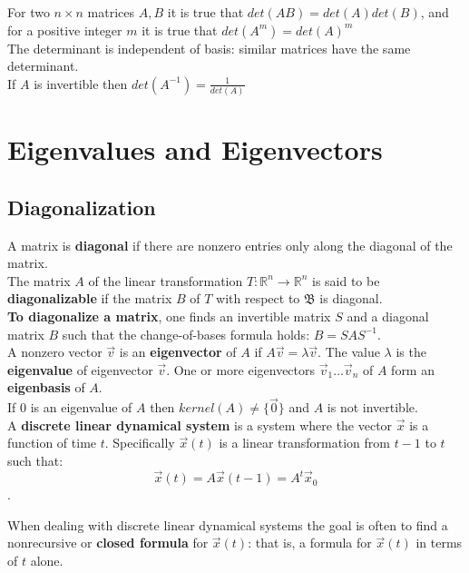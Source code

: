 \documentclass[]{scrartcl}
\begin{document}
	For two $n \times n$ matrices $A, B$ it is true that $det(AB) = det(A) det(B)$, and for a positive integer $m$ it is true that $det(A^m) = det(A)^m$\\
	
	The determinant is independent of basis: similar matrices have the same determinant.\\
	
	If $A$ is invertible then $det(A^{-1}) = \frac{1}{det(A)}$

	\setcounter{section}{6}
	\section{Eigenvalues and Eigenvectors}
	\subsection{Diagonalization}
	A matrix is \textbf{diagonal} if there are nonzero entries only along the diagonal of the matrix.\\
	
	The matrix $A$ of the linear transformation $T: \mathbb{R}^n \rightarrow \mathbb{R}^n$ is said to be \textbf{diagonalizable} if the matrix $B$ of $T$ with respect to $\mathfrak{B}$ is diagonal.\\
	
	\textbf{To diagonalize a matrix}, one finds an invertible matrix $S$ and a diagonal matrix $B$ such that the change-of-bases formula holds: $B = SAS^{-1}$.\\
	
	A nonzero vector $\vec{v}$ is an \textbf{eigenvector} of $A$ if $A\vec{v} = \lambda \vec{v}$. The value $\lambda$ is the \textbf{eigenvalue} of eigenvector $\vec{v}$. One or more eigenvectors $\vec{v}_1 \ldots \vec{v}_n$ of $A$ form an \textbf{eigenbasis} of $A$.\\
	
	If 0 is an eigenvalue of $A$ then $kernel(A) \neq \{\vec{0}\}$ and $A$ is not invertible.\\
	
	A \textbf{discrete linear dynamical system} is a system where the vector $\vec{x}$ is a function of time $t$. Specifically $\vec{x}(t)$ is a linear transformation from $t-1$ to $t$ such that:
	$$\vec{x}(t) = A\vec{x}(t-1) = A^t\vec{x}_0$$.
	
	When dealing with discrete linear dynamical systems the goal is often to find a nonrecursive or \textbf{closed formula} for $\vec{x}(t)$: that is, a formula for $\vec{x}(t)$ in terms of $t$ alone.\\
	
\end{document}
